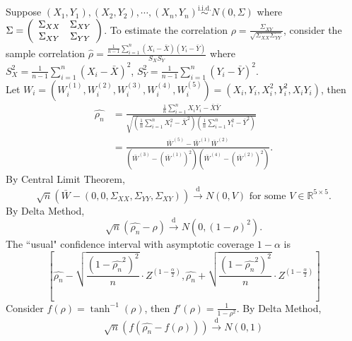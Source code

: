 \documentclass[a4paper]{article}
\begin{document}
\begin{eg}
	Suppose $(X_1,Y_1),(X_2,Y_2),\cdots,(X_n,Y_n) \stackrel{\text{i.i.d.}}{\sim} N(0,\Sigma)$ where $\Sigma = \left(\begin{array}{c c}
		\Sigma_{XX} & \Sigma_{XY} \\
		\Sigma_{XY} & \Sigma_{YY}
	\end{array}\right)$.
	To estimate the correlation $\rho = \frac{\Sigma_{XY}}{\sqrt{\Sigma_{XX}\Sigma_{YY}}}$, consider the sample correlation $\hat{\rho} = \frac{\frac{1}{n-1} \sum\limits_{i=1}^n(X_i-\bar{X})(Y_i-\bar{Y})}{S_XS_Y}$ where $S_X^2 =\frac{1}{n-1}\sum\limits_{i=1}^n(X_i-\bar{X})^2$,  $S_Y^2 =\frac{1}{n-1}\sum\limits_{i=1}^n(Y_i-\bar{Y})^2$. \\
	\newline
	Let $W_i = (W_i^{(1)},W_i^{(2)},W_i^{(3)},W_i^{(4)},W_i^{(5)}) = (X_i,Y_i,X_i^2,Y_i^2,X_iY_i)$, then
	\begin{equation*}
		\begin{aligned}
			\hat{\rho_n} &= \frac{\frac{1}{n}\sum\limits_{i=1}^n X_iY_i - \bar{X}\bar{Y}}{\sqrt{\left(\frac{1}{n}\sum\limits_{i=1}^nX_i^2 - \bar{X}^2\right)\left(\frac{1}{n}\sum\limits_{i=1}^nY_i^2 - \bar{Y}^2\right)}} \\
			&= \frac{\bar{W}^{(5)}-\bar{W}^{(1)}\bar{W}^{(2)}}{(\bar{W}^{(3)}-(\bar{W}^{(1)})^2)(\bar{W}^{(4)}-(\bar{W}^{(2)})^2)}.
		\end{aligned}
	\end{equation*}
	By Central Limit Theorem,
	\begin{equation*}
		\sqrt{n}(\bar{W}-(0,0,\Sigma_{XX},\Sigma_{YY},\Sigma_{XY})) \stackrel{\text{d}}{\longrightarrow} N(0,V) \text{ for some } V \in \mathbb{R}^{5 \times 5}.
	\end{equation*}
	By Delta Method,
	\begin{equation}
		\sqrt{n}(\hat{\rho_n} - \rho) \stackrel{\text{d}}{\longrightarrow} N(0,(1-\rho)^2).
	\end{equation}
	The ``usual" confidence interval with asymptotic coverage $1-\alpha$ is
	\begin{equation}
		\left[\hat{\rho_n}-\sqrt{\frac{(1-\hat{\rho_n}^2)^2}{n}} \cdot Z^{(1-\frac{\alpha}{2})},\hat{\rho_n}+\sqrt{\frac{(1-\hat{\rho_n}^2)^2}{n}} \cdot Z^{(1-\frac{\alpha}{2})}\right]
	\end{equation}
	Consider $f(\rho) = \tanh^{-1}(\rho)$, then $f'(\rho) = \frac{1}{1-\rho^2}$. By Delta Method,
	\begin{equation}
		\sqrt{n}(f(\hat{\rho_n} - f(\rho))) \stackrel{\text{d}}{\longrightarrow} N(0,1)

\end{equation}
\end{eg}
\end{document}
